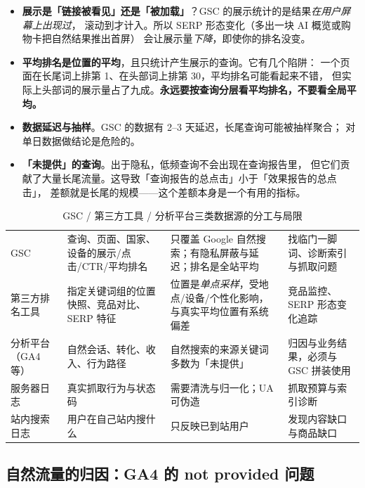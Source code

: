 \begin{itemize}
  \item \textbf{展示是「链接被看见」还是「被加载」}？GSC 的展示统计的是结果\emph{在用户屏幕上出现过}，
        滚动到才计入。所以 SERP 形态变化（多出一块 AI 概览或购物卡把自然结果推出首屏）
        会让展示量\emph{下降}，即使你的排名没变。
  \item \textbf{平均排名是位置的平均}，且只统计产生展示的查询。它有几个陷阱：
        一个页面在长尾词上排第 1、在头部词上排第 30，平均排名可能看起来不错，
        但实际上头部词的展示量占了九成。\textbf{永远要按查询分层看平均排名，不要看全局平均。}
  \item \textbf{数据延迟与抽样}。GSC 的数据有 2--3 天延迟，长尾查询可能被抽样聚合；
        对单日数据做结论是危险的。
  \item \textbf{「未提供」的查询}。出于隐私，低频查询不会出现在查询报告里，
        但它们贡献了大量长尾流量。这导致「查询报告的总点击」小于「效果报告的总点击」，
        差额就是长尾的规模——这个差额本身是一个有用的指标。
\end{itemize}

\begin{table}[htbp]
\centering
\caption{GSC / 第三方工具 / 分析平台三类数据源的分工与局限}
\label{tab:datasources}
\small
\begin{tabularx}{\textwidth}{L{2.2cm} L{2.9cm} L{3.0cm} Y}
\toprule
{} &  &  &  \\
\midrule
GSC & 查询、页面、国家、设备的展示/点击/CTR/平均排名 & 只覆盖 Google 自然搜索；有隐私屏蔽与延迟；排名是全站平均 & 找临门一脚词、诊断索引与抓取问题 \\
第三方排名工具 & 指定关键词组的位置快照、竞品对比、SERP 特征 & 位置是\emph{单点采样}，受地点/设备/个性化影响，与真实平均位置有系统偏差 & 竞品监控、SERP 形态变化追踪 \\
分析平台（GA4 等） & 自然会话、转化、收入、行为路径 & 自然搜索的来源关键词多数为「未提供」 & 归因与业务结果，必须与 GSC 拼装使用 \\
服务器日志 & 真实抓取行为与状态码 & 需要清洗与归一化；UA 可伪造 & 抓取预算与索引诊断 \\
站内搜索日志 & 用户在自己站内搜什么 & 只反映已到站用户 & 发现内容缺口与商品缺口 \\
\bottomrule
\end{tabularx}
\end{table}

\subsection{自然流量的归因：GA4 的 not provided 问题}


